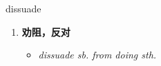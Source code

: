 
\begin{frame}
{\huge dissuade}
\begin{center}
\begin{enumerate}\Large
  \item \textbf{劝阻，反对}
  \begin{itemize}
    \item \em{\Large{dissuade sb. from doing sth.}}
  \end{itemize}
\end{enumerate}
\end{center}
\end{frame}
